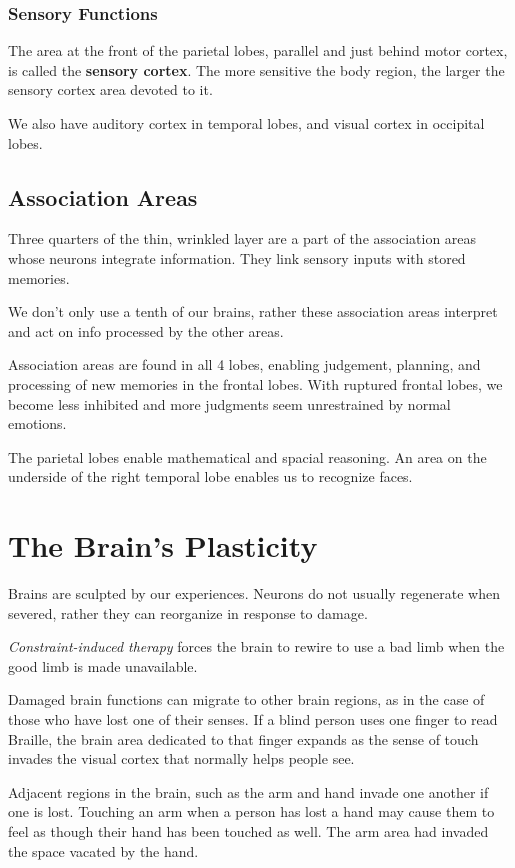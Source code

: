 \documentclass[12pt]{article}
\begin{document}
\subsubsection*{Sensory Functions}
The area at the front of the parietal lobes, parallel and just behind motor cortex, is called the \textbf{sensory cortex}. The more sensitive the body region, the larger the sensory cortex area devoted to it.

We also have auditory cortex in temporal lobes, and visual cortex in occipital lobes.

\subsection*{Association Areas}
Three quarters of the thin, wrinkled layer are a part of the association areas whose neurons integrate information. They link sensory inputs with stored memories.

We don't only use a tenth of our brains, rather these association areas interpret and act on info processed by the other areas.

Association areas are found in all 4 lobes, enabling judgement, planning, and processing of new memories in the frontal lobes. With ruptured frontal lobes, we become less inhibited and more judgments seem unrestrained by normal emotions.

The parietal lobes enable mathematical and spacial reasoning. An area on the underside of the right temporal lobe enables us to recognize faces.

\section*{The Brain's Plasticity}
Brains are sculpted by our experiences. Neurons do not usually regenerate when severed, rather they can reorganize in response to damage.

\textit{Constraint-induced therapy} forces the brain to rewire to use a bad limb when the good limb is made unavailable.

Damaged brain functions can migrate to other brain regions, as in the case of those who have lost one of their senses. If a blind person uses one finger to read Braille, the brain area dedicated to that finger expands as the sense of touch invades the visual cortex that normally helps people see.

Adjacent regions in the brain, such as the arm and hand invade one another if one is lost. Touching an arm when a person has lost a hand may cause them to feel as though their hand has been touched as well. The arm area had invaded the space vacated by the hand.
\end{document}
